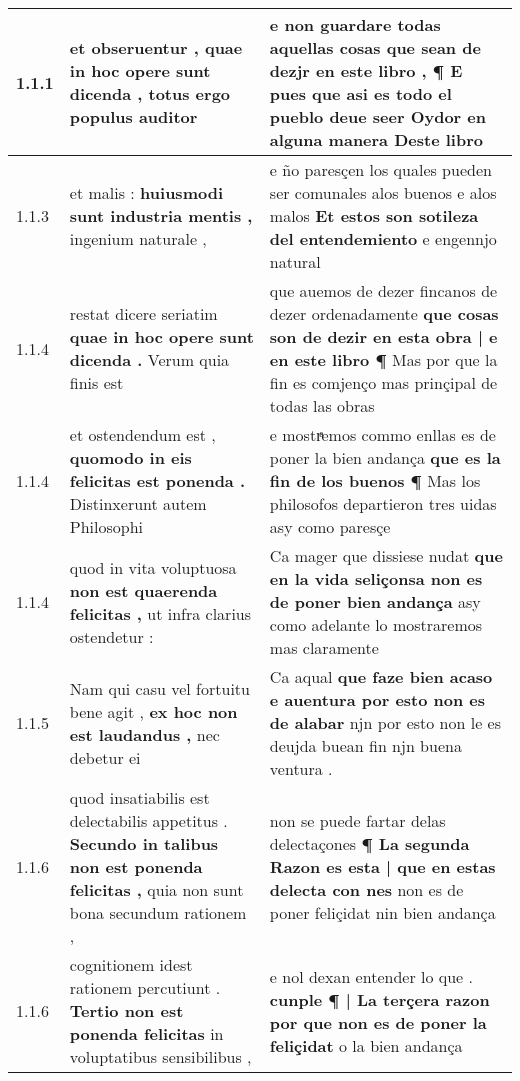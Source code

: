 \begin{tabular}{|p{1cm}|p{6.5cm}|p{6.5cm}|}

\hline
1.1.1 & et obseruentur , \textbf{ quae in hoc opere sunt dicenda , } totus ergo populus auditor & e non guardare todas aquellas cosas \textbf{ que sean de dezjr en este libro , } ¶ E pues que asi es todo el pueblo deue seer Oydor en alguna manera Deste libro \\\hline
1.1.3 & et malis : \textbf{ huiusmodi sunt industria mentis , } ingenium naturale , & e ño paresçen los quales pueden ser comunales alos buenos e alos malos \textbf{ Et estos son sotileza del entendemiento } e engennjo natural \\\hline
1.1.4 & restat dicere seriatim \textbf{ quae in hoc opere sunt dicenda . } Verum quia finis est & que auemos de dezer fincanos de dezer ordenadamente \textbf{ que cosas son de dezir en esta obra | e en este libro ¶ } Mas por que la fin es comjenço mas prinçipal de todas las obras \\\hline
1.1.4 & et ostendendum est , \textbf{ quomodo in eis felicitas est ponenda . } Distinxerunt autem Philosophi & e mostrͣemos commo enllas es de poner la bien andança \textbf{ que es la fin de los buenos ¶ } Mas los philosofos departieron tres uidas asy como paresçe \\\hline
1.1.4 & quod in vita voluptuosa \textbf{ non est quaerenda felicitas , } ut infra clarius ostendetur : & Ca mager que dissiese nudat \textbf{ que en la vida seliçonsa non es de poner bien andança } asy como adelante lo mostraremos mas claramente \\\hline
1.1.5 & Nam qui casu vel fortuitu bene agit , \textbf{ ex hoc non est laudandus , } nec debetur ei & Ca aqual \textbf{ que faze bien acaso e auentura por esto non es de alabar } njn por esto non le es deujda buean fin njn buena ventura . \\\hline
1.1.6 & quod insatiabilis est delectabilis appetitus . \textbf{ Secundo in talibus non est ponenda felicitas , } quia non sunt bona secundum rationem , & non se puede fartar delas delectaçones \textbf{ ¶ La segunda Razon es esta | que en estas delecta con nes } non es de poner feliçidat nin bien andança \\\hline
1.1.6 & cognitionem idest rationem percutiunt . \textbf{ Tertio non est ponenda felicitas } in voluptatibus sensibilibus , & e nol dexan entender lo que . \textbf{ cunple ¶ | La terçera razon por que non es de poner la feliçidat } o la bien andança \\\hline

\end{tabular}
